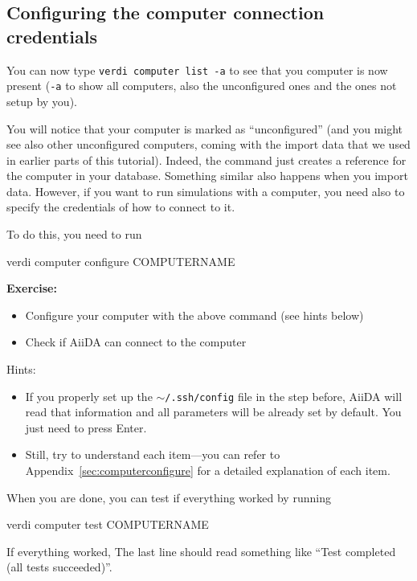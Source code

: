 \subsection{Configuring the computer connection credentials}

You can now type \texttt{verdi computer list -a} to see that you computer is now present (\texttt{-a} to show all computers, also the unconfigured ones and the ones not setup by you). 

You will notice that your computer is marked as ``unconfigured'' (and you might see also other unconfigured computers, coming with the import data that we used in earlier parts of this tutorial). Indeed, the command  just creates a reference for the computer in your database. Something similar also happens when you import data. However, if you want to run simulations with a computer, you need also to specify the credentials of how to connect to it. 

To do this, you need to run 
\begin{bashcommand}
verdi computer configure COMPUTERNAME
\end{bashcommand}

\begin{tcolorbox}
\textbf{Exercise:}
\begin{itemize}
\item Configure your computer with the above command (see hints below)
\item Check if AiiDA can connect to the computer
\end{itemize}
\end{tcolorbox}

Hints:
\begin{itemize}
\item If you properly set up the \texttt{$\sim$/.ssh/config} file in the step before, AiiDA will read that information and all parameters will be already set by default. You just need to press Enter. 
\item Still, try to understand each item---you can refer to Appendix~\ref{sec:computerconfigure} for a detailed explanation of each item.
\end{itemize}

When you are done, you can test if everything worked by running
\begin{bashcommand}
verdi computer test COMPUTERNAME
\end{bashcommand}
If everything worked, The last line should read something like ``Test completed (all tests succeeded)''.

